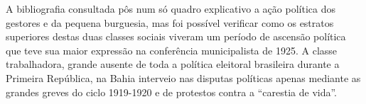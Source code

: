 A bibliografia consultada pôs num só quadro explicativo a ação política dos gestores e da pequena burguesia, mas foi possível verificar como os estratos superiores destas duas classes sociais viveram um período de ascensão política que teve sua maior expressão na conferência municipalista de 1925. A classe trabalhadora, grande ausente de toda a política eleitoral brasileira durante a Primeira República, na Bahia interveio nas disputas políticas apenas mediante as grandes greves do ciclo 1919-1920 e de protestos contra a ``carestia de vida''.